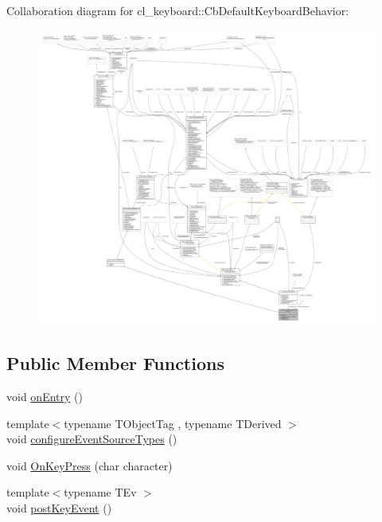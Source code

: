 Collaboration diagram for cl\+\_\+keyboard\+:\+:Cb\+Default\+Keyboard\+Behavior\+:
\nopagebreak
\begin{figure}[H]
\begin{center}
\leavevmode
\includegraphics[width=350pt]{classcl__keyboard_1_1CbDefaultKeyboardBehavior__coll__graph}
\end{center}
\end{figure}
\subsection*{Public Member Functions}
\begin{DoxyCompactItemize}
\item 
void \hyperlink{classcl__keyboard_1_1CbDefaultKeyboardBehavior_a06e49d8c78aeffecf74c27b05f529a3a}{on\+Entry} ()
\item 
{\footnotesize template$<$typename T\+Object\+Tag , typename T\+Derived $>$ }\\void \hyperlink{classcl__keyboard_1_1CbDefaultKeyboardBehavior_a6801e961040358ab8fb547ca7e113082}{configure\+Event\+Source\+Types} ()
\item 
void \hyperlink{classcl__keyboard_1_1CbDefaultKeyboardBehavior_aa834f8e626a306920e536e7535041ac3}{On\+Key\+Press} (char character)
\item 
{\footnotesize template$<$typename T\+Ev $>$ }\\void \hyperlink{classcl__keyboard_1_1CbDefaultKeyboardBehavior_afe6105db2d58fee99754cb4a47835988}{post\+Key\+Event} ()
\end{DoxyCompactItemize}
